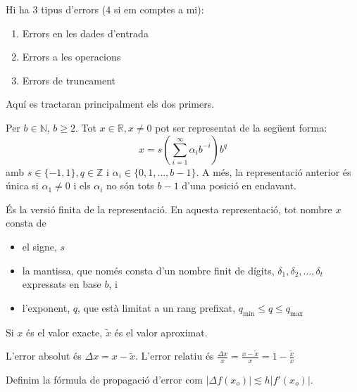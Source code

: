 \documentclass[../main.tex]{subfiles}
\begin{document}
    Hi ha 3 tipus d'errors (4 si em comptes a mi):
    \begin{enumerate}
        \item Errors en les dades d'entrada
        \item Errors a les operacions
        \item Errors de truncament
    \end{enumerate}
    Aquí es tractaran principalment els dos primers.
    \begin{teorema}
        Per $b \in \mathbb{N}$, $b \geq 2$. Tot $x \in \mathbb{R}, x\neq 0$ pot ser representat de
        la següent forma:
        \begin{displaymath}
            x = s(\sum\limits_{i=1}^{\infty}\alpha_ib^{-i}) b^q
        \end{displaymath}
        amb $s \in \{-1, 1\}, q \in \mathbb{Z}$ i $\alpha_i \in \{0, 1, \dots, b-1\}$. A més, la
        representació anterior és única si $\alpha_1 \neq 0$ i els $\alpha_i$ no són tots $b-1$ 
        d'una posició en endavant.
    \end{teorema}
    \begin{definicio}
        És la versió finita de la representació. En aquesta representació, tot nombre $x$ consta de 
        \begin{itemize}
            \item el signe, $s$
            \item la mantissa, que només consta d'un nombre finit de dígits, $\delta_1, \delta_2, \dots, \delta_t$
            expressats en base $b$, i
            \item l'exponent, $q$, que està limitat a un rang prefixat, $q_\text{min} \leq q \leq q_\text{max}$
        \end{itemize}
    \end{definicio}
    \begin{notacio}
        Si $x$ és el valor exacte, $\tilde{x}$ és el valor aproximat.
    \end{notacio}
    \begin{definicio}
        L'error absolut és $\Delta x = x - \tilde{x}$. L'error relatiu és $\frac{\Delta x}{x} = \frac{x-\tilde{x}}{x} = 1 - \frac{\tilde{x}}{x}$
    \end{definicio}
    \begin{definicio}
        Definim la fórmula de propagació d'error com $\left\lvert \Delta f(x_o) \right\rvert \lesssim h|f'(x_o)|$.
    \end{definicio}
\end{document}
